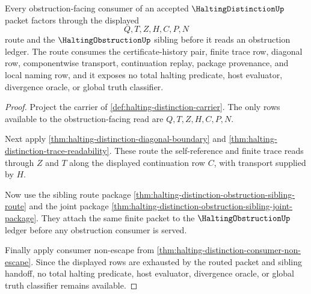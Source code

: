 \begin{theorem}
\label{thm:halting-distinction-route-obstruction-triad}
Every obstruction-facing consumer of an accepted $\HaltingDistinctionUp$ packet factors through the displayed
$$
Q,T,Z,H,C,P,N
$$
route and the $\HaltingObstructionUp$ sibling before it reads an obstruction ledger. The route consumes the certificate-history pair, finite trace row, diagonal row, componentwise transport, continuation replay, package provenance, and local naming row, and it exposes no total halting predicate, host evaluator, divergence oracle, or global truth classifier.
\end{theorem}
\begin{proof}
Project the carrier of \autoref{def:halting-distinction-carrier}. The only rows available to the obstruction-facing read are $Q,T,Z,H,C,P,N$.

Next apply \autoref{thm:halting-distinction-diagonal-boundary} and \autoref{thm:halting-distinction-trace-readability}. These route the self-reference and finite trace reads through $Z$ and $T$ along the displayed continuation row $C$, with transport supplied by $H$.

Now use the sibling route package \autoref{thm:halting-distinction-obstruction-sibling-route} and the joint package \autoref{thm:halting-distinction-obstruction-sibling-joint-package}. They attach the same finite packet to the $\HaltingObstructionUp$ ledger before any obstruction consumer is served.

Finally apply consumer non-escape from \autoref{thm:halting-distinction-consumer-non-escape}. Since the displayed rows are exhausted by the routed packet and sibling handoff, no total halting predicate, host evaluator, divergence oracle, or global truth classifier remains available.
\end{proof}

